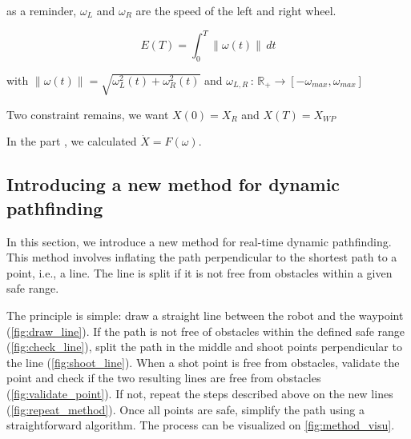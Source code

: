 \documentclass[../main.tex]{subfiles}
\begin{document}
as a reminder, $\omega_L$ and $\omega_R$ are the speed of the left and right wheel.

$$
\displaystyle E(T) = \int_{0}^{T} \| \omega(t) \| \, dt
$$

with $\displaystyle \| \omega (t) \| = \sqrt{\omega_L^{2}(t) + \omega_R^{2}(t)}$ and  $\omega_{L, R} \,:\, \mathbb{R}_+ \longrightarrow [-\omega_{max}, \omega_{max}]$ 

Two constraint remains, we want $X(0) = X_R$ and $X(T) = X_{WP}$

In the part \figtonum, we calculated $\dot{X} = F(\omega)$.


\subsection{Introducing a new method for dynamic pathfinding}

In this section, we introduce a new method for real-time dynamic pathfinding. This method involves inflating the path perpendicular to the shortest path to a point, i.e., a line. The line is split if it is not free from obstacles within a given safe range.

The principle is simple: draw a straight line between the robot and the waypoint (\autoref{fig:draw_line}). If the path is not free of obstacles within the defined safe range (\autoref{fig:check_line}), split the path in the middle and shoot points perpendicular to the line (\autoref{fig:shoot_line}). When a shot point is free from obstacles, validate the point and check if the two resulting lines are free from obstacles (\autoref{fig:validate_point}). If not, repeat the steps described above on the new lines (\autoref{fig:repeat_method}). Once all points are safe, simplify the path using a straightforward algorithm. The process can be visualized on \autoref{fig:method_visu}.
\end{document}
